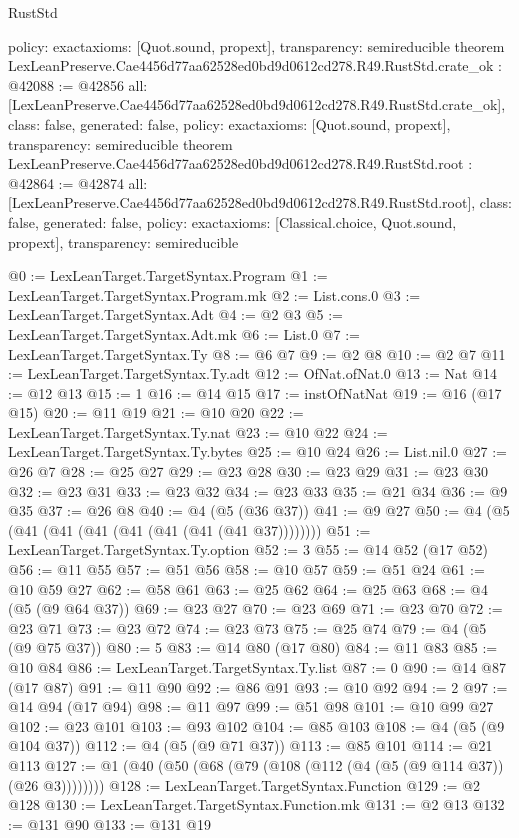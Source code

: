 \begin{lexlean}{RustStd}
\begin{coremodule}
{  policy: exact{axioms: [Quot.sound, propext]},
  transparency: semireducible
}
theorem LexLeanPreserve.Cae4456d77aa62528ed0bd9d0612cd278.R49.RustStd.crate_ok : @42088 := @42856 {
  all: [LexLeanPreserve.Cae4456d77aa62528ed0bd9d0612cd278.R49.RustStd.crate_ok],
  class: false,
  generated: false,
  policy: exact{axioms: [Quot.sound, propext]},
  transparency: semireducible
}
theorem LexLeanPreserve.Cae4456d77aa62528ed0bd9d0612cd278.R49.RustStd.root : @42864 := @42874 {
  all: [LexLeanPreserve.Cae4456d77aa62528ed0bd9d0612cd278.R49.RustStd.root],
  class: false,
  generated: false,
  policy: exact{axioms: [Classical.choice, Quot.sound, propext]},
  transparency: semireducible
}

@0 := LexLeanTarget.TargetSyntax.Program
@1 := LexLeanTarget.TargetSyntax.Program.mk
@2 := List.cons.{0}
@3 := LexLeanTarget.TargetSyntax.Adt
@4 := @2 @3
@5 := LexLeanTarget.TargetSyntax.Adt.mk
@6 := List.{0}
@7 := LexLeanTarget.TargetSyntax.Ty
@8 := @6 @7
@9 := @2 @8
@10 := @2 @7
@11 := LexLeanTarget.TargetSyntax.Ty.adt
@12 := OfNat.ofNat.{0}
@13 := Nat
@14 := @12 @13
@15 := 1
@16 := @14 @15
@17 := instOfNatNat
@19 := @16 (@17 @15)
@20 := @11 @19
@21 := @10 @20
@22 := LexLeanTarget.TargetSyntax.Ty.nat
@23 := @10 @22
@24 := LexLeanTarget.TargetSyntax.Ty.bytes
@25 := @10 @24
@26 := List.nil.{0}
@27 := @26 @7
@28 := @25 @27
@29 := @23 @28
@30 := @23 @29
@31 := @23 @30
@32 := @23 @31
@33 := @23 @32
@34 := @23 @33
@35 := @21 @34
@36 := @9 @35
@37 := @26 @8
@40 := @4 (@5 (@36 @37))
@41 := @9 @27
@50 := @4 (@5 (@41 (@41 (@41 (@41 (@41 (@41 (@41 @37))))))))
@51 := LexLeanTarget.TargetSyntax.Ty.option
@52 := 3
@55 := @14 @52 (@17 @52)
@56 := @11 @55
@57 := @51 @56
@58 := @10 @57
@59 := @51 @24
@61 := @10 @59 @27
@62 := @58 @61
@63 := @25 @62
@64 := @25 @63
@68 := @4 (@5 (@9 @64 @37))
@69 := @23 @27
@70 := @23 @69
@71 := @23 @70
@72 := @23 @71
@73 := @23 @72
@74 := @23 @73
@75 := @25 @74
@79 := @4 (@5 (@9 @75 @37))
@80 := 5
@83 := @14 @80 (@17 @80)
@84 := @11 @83
@85 := @10 @84
@86 := LexLeanTarget.TargetSyntax.Ty.list
@87 := 0
@90 := @14 @87 (@17 @87)
@91 := @11 @90
@92 := @86 @91
@93 := @10 @92
@94 := 2
@97 := @14 @94 (@17 @94)
@98 := @11 @97
@99 := @51 @98
@101 := @10 @99 @27
@102 := @23 @101
@103 := @93 @102
@104 := @85 @103
@108 := @4 (@5 (@9 @104 @37))
@112 := @4 (@5 (@9 @71 @37))
@113 := @85 @101
@114 := @21 @113
@127 := @1 (@40 (@50 (@68 (@79 (@108 (@112 (@4 (@5 (@9 @114 @37)) (@26 @3))))))))
@128 := LexLeanTarget.TargetSyntax.Function
@129 := @2 @128
@130 := LexLeanTarget.TargetSyntax.Function.mk
@131 := @2 @13
@132 := @131 @90
@133 := @131 @19

\end{coremodule}
\end{lexlean}
